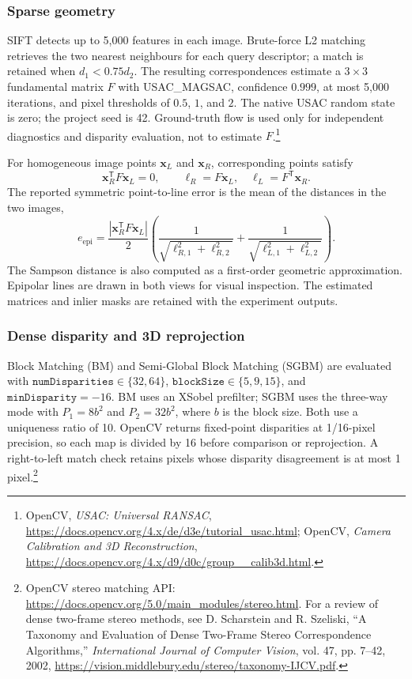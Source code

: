 \documentclass[a4paper,12pt]{article}
\begin{document}
\subsubsection{Sparse geometry}
SIFT detects up to 5,000 features in each image. Brute-force L2 matching retrieves the two nearest neighbours for each query descriptor; a match is retained when $d_1<0.75d_2$. The resulting correspondences estimate a $3\times3$ fundamental matrix $F$ with USAC\_MAGSAC, confidence $0.999$, at most 5,000 iterations, and pixel thresholds of $0.5$, $1$, and $2$. The native USAC random state is zero; the project seed is 42. Ground-truth flow is used only for independent diagnostics and disparity evaluation, not to estimate $F$.\footnote{OpenCV, \emph{USAC: Universal RANSAC}, \url{https://docs.opencv.org/4.x/de/d3e/tutorial_usac.html}; OpenCV, \emph{Camera Calibration and 3D Reconstruction}, \url{https://docs.opencv.org/4.x/d9/d0c/group__calib3d.html}.}

For homogeneous image points $\mathbf{x}_L$ and $\mathbf{x}_R$, corresponding points satisfy
\begin{equation}
\mathbf{x}_R^{\mathsf T}F\mathbf{x}_L=0,\qquad
\boldsymbol{\ell}_R=F\mathbf{x}_L,\quad
\boldsymbol{\ell}_L=F^{\mathsf T}\mathbf{x}_R.
\end{equation}
The reported symmetric point-to-line error is the mean of the distances in the two images,
\begin{equation}
e_{\mathrm{epi}}=\frac{|\mathbf{x}_R^{\mathsf T}F\mathbf{x}_L|}{2}
\left(\frac{1}{\sqrt{\ell_{R,1}^2+\ell_{R,2}^2}}+
\frac{1}{\sqrt{\ell_{L,1}^2+\ell_{L,2}^2}}\right).
\end{equation}
The Sampson distance is also computed as a first-order geometric approximation. Epipolar lines are drawn in both views for visual inspection. The estimated matrices and inlier masks are retained with the experiment outputs.

\subsubsection{Dense disparity and 3D reprojection}
Block Matching (BM) and Semi-Global Block Matching (SGBM) are evaluated with $\texttt{numDisparities}\in\{32,64\}$, $\texttt{blockSize}\in\{5,9,15\}$, and $\texttt{minDisparity}=-16$. BM uses an XSobel prefilter; SGBM uses the three-way mode with $P_1=8b^2$ and $P_2=32b^2$, where $b$ is the block size. Both use a uniqueness ratio of 10. OpenCV returns fixed-point disparities at 1/16-pixel precision, so each map is divided by 16 before comparison or reprojection. A right-to-left match check retains pixels whose disparity disagreement is at most 1 pixel.\footnote{OpenCV stereo matching API: \url{https://docs.opencv.org/5.0/main_modules/stereo.html}. For a review of dense two-frame stereo methods, see D. Scharstein and R. Szeliski, “A Taxonomy and Evaluation of Dense Two-Frame Stereo Correspondence Algorithms,” \emph{International Journal of Computer Vision}, vol. 47, pp. 7--42, 2002, \url{https://vision.middlebury.edu/stereo/taxonomy-IJCV.pdf}.}
\end{document}

